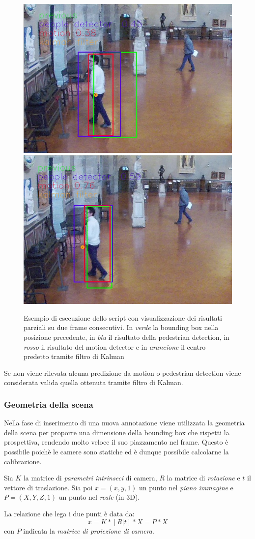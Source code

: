 \begin{figure}[h]
\centering
\includegraphics[width=.4\textwidth]{images/prediction1.jpg}\quad
\medskip
\includegraphics[width=.4\textwidth]{images/prediction2.jpg}\quad
\caption{Esempio di esecuzione dello script con visualizzazione dei risultati parziali su due frame consecutivi. In \emph{verde} la bounding box nella posizione precedente, in \emph{blu} il risultato della pedestrian detection, in \emph{rosso} il risultato del motion detector e in \emph{arancione} il centro predetto tramite filtro di Kalman}
\label{fig:prediction}
\end{figure}

Se non viene rilevata alcuna predizione da motion o pedestrian detection viene considerata valida quella ottenuta tramite filtro di Kalman.


\subsubsection{Geometria della scena}

Nella fase di inserimento di una nuova annotazione viene utilizzata la geometria della scena per proporre una dimensione della bounding box che rispetti la prospettiva, rendendo molto veloce il suo piazzamento nel frame.
Questo è possibile poichè le camere sono statiche ed è dunque possibile calcolarne la calibrazione. 

Sia $K$ la matrice di \emph{parametri intrinseci} di camera, $R$ la matrice di \emph{rotazione} e $t$ il vettore di traslazione. Sia poi $x = (x, y, 1)$ un punto nel \emph{piano immagine} e $P = (X, Y, Z, 1)$ un punto nel \emph{reale} (in 3D). 

La relazione che lega i due punti è data da:
\begin{equation}
x = K*[R|t]* X = P * X
\end{equation}
con $P$ indicata la \emph{matrice di proiezione di camera}. 

